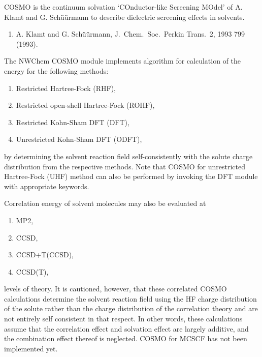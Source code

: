 \label{sec:cosmo}

COSMO is the continuum solvation `COnductor-like Screening MOdel'
of A. Klamt and G. Sch\"{u}\"{u}rmann to describe dielectric screening
effects in solvents.

\begin{enumerate}
\item A. Klamt and G. Sch\"{u}\"{u}rmann, J.~Chem.~Soc.~Perkin Trans.~2, 1993
799 (1993).
\end{enumerate}

The NWChem COSMO module implements algorithm for calculation of the
energy for the following methods:
\begin{enumerate}
\item Restricted Hartree-Fock (RHF),
\item Restricted open-shell Hartree-Fock (ROHF),
\item Restricted Kohn-Sham DFT (DFT),
\item Unrestricted Kohn-Sham DFT (ODFT),
\end{enumerate}
by determining the solvent reaction field self-consistently
with the solute charge distribution from the respective methods.
Note that COSMO for unrestricted Hartree-Fock (UHF) method
can also be performed by invoking the DFT module with appropriate
keywords.

Correlation energy of solvent molecules may also be evaluated at 
\begin{enumerate}
\item MP2,
\item CCSD,
\item CCSD+T(CCSD),
\item CCSD(T),
\end{enumerate}
levels of theory.  It is cautioned,
however, that these correlated COSMO calculations determine
the solvent reaction field using the HF charge distribution of
the solute rather than the charge distribution of the correlation
theory and are not entirely self consistent in that respect.  
In other words, these calculations assume that the correlation
effect and solvation effect are largely additive, and the combination
effect thereof is neglected. 
COSMO for MCSCF has not been implemented yet. 

